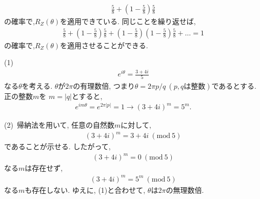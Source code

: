 \begin{ex}
    \begin{align*}
        \frac{5}{8} + \left(1 - \frac{5}{8}\right) \frac{5}{8}
    \end{align*}
    の確率で,$R_Z(\theta)$を適用できている. 同じことを繰り返せば,
    \begin{align*}
        \frac{5}{8} + \left(1 - \frac{5}{8}\right) \frac{5}{8} +\left(1 - \frac{5}{8}\right)\left(1 - \frac{5}{8}\right)\frac{5}{8} + \dots = 1
    \end{align*}
    の確率で,$R_Z(\theta)$を適用させることができる.
\end{ex}

\begin{ex}
    \label{ex4.42}
    (1) \
    \begin{align*}
        e^{i \theta} = \frac{3 + 4i}{5}
    \end{align*}
    なる$\theta$を考える.
    $\theta$が$2\pi$の有理数倍, つまり$\theta =2 \pi p / q\ (p, q は整数)$であるとする. 正の整数$m$を
    $m = |q|$とすると,
    \begin{align*}
        e^{ i m \theta} = e^{2 \pi |p|} = 1 \to (3+4i)^m = 5^m.
    \end{align*}
    \par
    (2)\
    帰納法を用いて, 任意の自然数$m$に対して,
    \begin{align*}
        (3+4i)^m  = 3 + 4i \ (\mathrm{mod}\ 5)
    \end{align*}
    であることが示せる. したがって,
    \begin{align*}
        (3+4i)^m  = 0\ (\mathrm{mod}\ 5)
    \end{align*}
    なる$m$は存在せず,
    \begin{align*}
        (3+4i)^m  = 5^m\ (\mathrm{mod}\ 5)
    \end{align*}
    なる$m$も存在しない. ゆえに, (1)と合わせて, $\theta$は$2 \pi$の無理数倍.
\end{ex}

